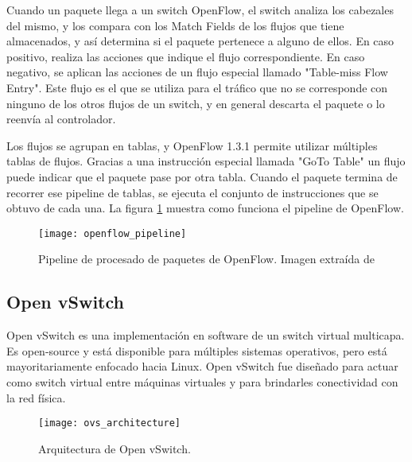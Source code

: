 Cuando un paquete llega a un switch OpenFlow, el switch analiza los cabezales del mismo, y los compara con los Match Fields de los flujos que tiene almacenados, y así determina si el paquete pertenece a alguno de ellos. En caso positivo, realiza las acciones que indique el flujo correspondiente. En caso negativo, se aplican las acciones de un flujo especial llamado "Table-miss Flow Entry". Este flujo es el que se utiliza para el tráfico que no se corresponde con ninguno de los otros flujos de un switch, y en general descarta el paquete o lo reenvía al controlador.

Los flujos se agrupan en tablas, y OpenFlow 1.3.1 permite utilizar múltiples tablas de flujos. Gracias a una instrucción especial llamada "GoTo Table" un flujo puede indicar que el paquete pase por otra tabla. Cuando el paquete termina de recorrer ese pipeline de tablas, se ejecuta el conjunto de instrucciones que se obtuvo de cada una. La figura \ref{fig:openflow_pipeline} muestra como funciona el pipeline de OpenFlow.

\begin{figure}[h] 
	\centering    
	\texttt{[image: openflow\_pipeline]}
	\caption{Pipeline de procesado de paquetes de OpenFlow. Imagen extraída de \cite{openflow-1.3.1}}
	\label{fig:openflow_pipeline}
\end{figure}

\subsection{Open vSwitch}
Open vSwitch \cite{ovs} es una implementación en software de un switch virtual multicapa. Es open-source y está disponible para múltiples sistemas operativos, pero está mayoritariamente enfocado hacia Linux. Open vSwitch fue diseñado para actuar como switch virtual entre máquinas virtuales y para brindarles conectividad con la red física.

\begin{figure}[H] 
	\centering    
	\texttt{[image: ovs\_architecture]}
	\caption{Arquitectura de Open vSwitch.}
	\label{fig:ovs_architecture}
\end{figure}

